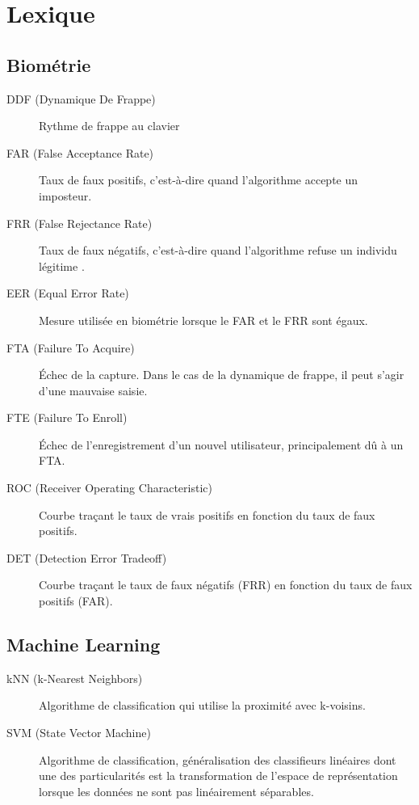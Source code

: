 \section{Lexique}

\subsection{Biométrie}

\begin{description}
  \item[DDF (Dynamique De Frappe)] Rythme de frappe au clavier
  \item[FAR (False Acceptance Rate)] Taux de faux positifs, c'est-à-dire quand l'algorithme accepte un imposteur.
  \item[FRR (False Rejectance Rate)] Taux de faux négatifs, c'est-à-dire quand l'algorithme refuse un individu légitime .
  \item[EER (Equal Error Rate)] Mesure utilisée en biométrie lorsque le FAR et le FRR sont égaux.
  \item[FTA (Failure To Acquire)] Échec de la capture. Dans le cas de la dynamique de frappe, il peut s'agir d'une mauvaise saisie.
  \item[FTE (Failure To Enroll)] Échec de l'enregistrement d'un nouvel utilisateur, principalement dû à un FTA.
  \item[ROC (Receiver Operating Characteristic)] Courbe traçant le taux de vrais positifs en fonction du taux de faux positifs.
  \item[DET (Detection Error Tradeoff)] Courbe traçant le taux de faux négatifs (FRR) en fonction du taux de faux positifs (FAR).
\end{description}

\subsection{Machine Learning}

\begin{description}
  \item[kNN (k-Nearest Neighbors)] Algorithme de classification qui utilise la proximité avec k-voisins.
  \item[SVM (State Vector Machine)] Algorithme de classification, généralisation des classifieurs linéaires dont une des particularités est la transformation de l'espace de représentation lorsque les données ne sont pas linéairement séparables. 
\end{description}

